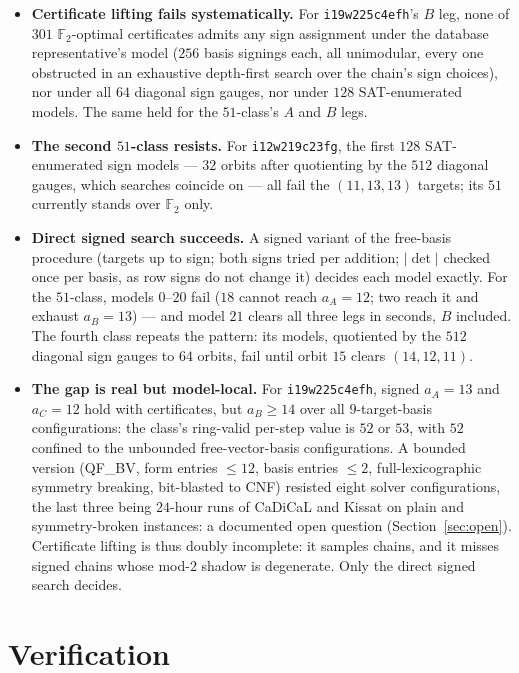 \documentclass[11pt]{article}
\theoremstyle{definition}
\theoremstyle{remark}
\newcommand{\F}{\mathbb{F}}
\begin{document}
\begin{itemize}
\item \textbf{Certificate lifting fails systematically.}  For
  \texttt{i19w225c4efh}'s $B$ leg, none of $301$ $\F_2$-optimal
  certificates admits any sign assignment under the database
  representative's model ($256$ basis signings each, all unimodular,
  every one obstructed in an exhaustive depth-first search over the
  chain's sign choices), nor under all $64$ diagonal sign gauges, nor
  under $128$ SAT-enumerated models.  The same held for the
  $51$-class's $A$ and $B$ legs.
\item \textbf{The second $51$-class resists.}  For
  \texttt{i12w219c23fg}, the first $128$ SAT-enumerated sign models
  --- $32$ orbits after quotienting by the $512$ diagonal gauges,
  which searches coincide on --- all fail the $(11,13,13)$ targets;
  its $51$ currently stands over $\F_2$ only.
\item \textbf{Direct signed search succeeds.}  A signed variant of the
  free-basis procedure (targets up to sign; both signs tried per
  addition; $|\det|$ checked once per basis, as row signs do not
  change it) decides each model exactly.  For the $51$-class, models
  $0$--$20$ fail ($18$ cannot reach $a_A=12$; two reach it and
  exhaust $a_B=13$) --- and model $21$ clears all three legs in
  seconds, $B$ included.  The fourth class repeats the pattern:
  its models, quotiented by the $512$ diagonal sign gauges to $64$
  orbits, fail until orbit $15$ clears $(14,12,11)$.
\item \textbf{The gap is real but model-local.}  For
  \texttt{i19w225c4efh}, signed $a_A=13$ and $a_C=12$ hold with
  certificates, but $a_B\ge14$ over all $9$-target-basis
  configurations: the class's ring-valid per-step value is $52$ or
  $53$, with $52$ confined to the unbounded free-vector-basis
  configurations.  A bounded version (QF\_BV, form entries $\le12$,
  basis entries $\le2$, full-lexicographic symmetry breaking,
  bit-blasted to CNF) resisted eight solver configurations, the last
  three being $24$-hour runs of CaDiCaL and Kissat on plain and
  symmetry-broken instances: a documented open question
  (Section~\ref{sec:open}).
  Certificate lifting is thus doubly incomplete: it samples chains,
  and it misses signed chains whose mod-$2$ shadow is degenerate.
  Only the direct signed search decides.
\end{itemize}

\section{Verification}\label{sec:verify}
\end{document}

